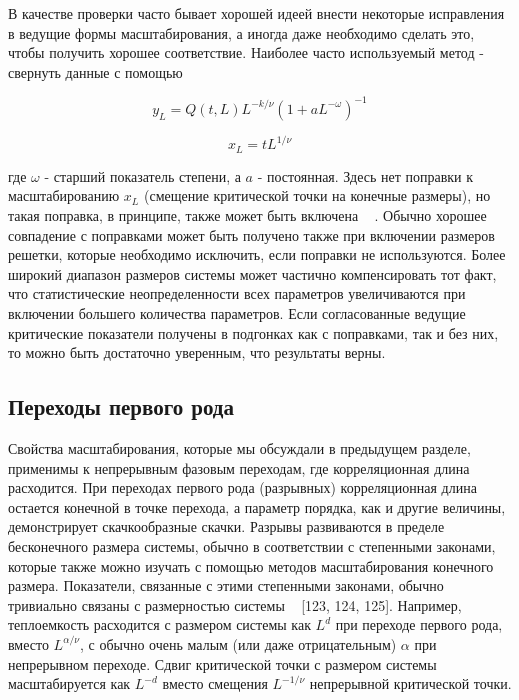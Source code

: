 \documentclass[11pt]{article}
\begin{document}
В качестве проверки часто бывает хорошей идеей внести некоторые исправления в ведущие формы масштабирования, а иногда даже необходимо сделать это, чтобы получить хорошее соответствие. Наиболее часто используемый метод - свернуть данные с помощью

\begin{equation}
y_L=Q(t,L)L^{-k/\nu}(1+aL^{-\omega})^{-1}
\label{eq_78}
\end{equation}

\begin{equation*}
x_L=tL^{1/\nu}
\end{equation*}

где $\omega$ - старший показатель степени, а $a$ - постоянная. Здесь нет поправки к масштабированию $x_L$ (смещение критической точки на конечные размеры), но такая поправка, в принципе, также может быть включена ~\cite{prb_73_014431} . Обычно хорошее совпадение с поправками может быть получено также при включении размеров решетки, которые необходимо исключить, если поправки не используются.
Более широкий диапазон размеров системы может частично компенсировать тот факт, что статистические неопределенности всех параметров увеличиваются при включении большего количества параметров. Если согласованные ведущие критические показатели получены в подгонках как с поправками, так и без них, то можно быть достаточно уверенным, что результаты верны.

\subsection{Переходы первого рода}
Свойства масштабирования, которые мы обсуждали в предыдущем разделе, применимы к непрерывным фазовым переходам, где корреляционная длина расходится. При переходах первого рода (разрывных) корреляционная длина остается конечной в точке перехода, а параметр порядка, как и другие величины, демонстрирует скачкообразные скачки. Разрывы развиваются в пределе бесконечного размера системы, обычно в соответствии с степенными законами, которые также можно изучать с помощью методов масштабирования конечного размера. Показатели, связанные с этими степенными законами, обычно тривиально связаны с размерностью системы ~\cite{prb_26_2507, phys_91_113, prb_43_3265} [123, 124, 125]. Например, теплоемкость расходится с размером системы как $L^d$ при переходе первого рода, вместо $L^{\alpha/\nu}$, с обычно очень малым (или даже отрицательным) $\alpha$ при непрерывном переходе. Сдвиг критической точки с размером системы масштабируется как $L^{−d}$ вместо смещения $L^{−1/\nu}$ непрерывной критической точки.
\end{document}
